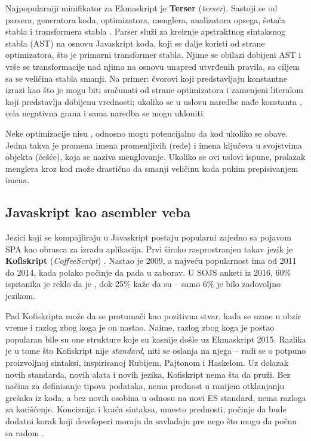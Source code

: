 Najpopularniji minifikator za Ekmaskript je \textbf{Terser} (\textsl{terser}).
Sastoji se od parsera, generatora koda, optimizatora, menglera, analizatora opsega, šetača stabla i transformera stabla \cite{uglify}.
Parser služi za kreirnje apstraktnog sintaksnog stabla (AST) na osnovu Javaskript koda, koji se dalje koristi od strane optimizatora, što je primarni transformer stabla.
Njime se obilazi dobijeni AST i vrše se transformacije nad njima na osnovu unapred utvrđenih pravila, sa ciljem sa se veličina stabla smanji.
Na primer: čvorovi koji predstavljaju konstantne izrazi kao što je  mogu biti sračunati od strane optimizatora i zamenjeni literalom koji predstavlja dobijenu vrednosti; ukoliko se u uslovu naredbe  nađe konstanta , cela negativna grana i sama naredba  se mogu ukloniti.

Neke optimizacije nisu , odnosno mogu potencijalno da  kod ukoliko se obave.
Jedna takva je promena imena promenljivih (ređe) i imena ključeva u svojstvima objekta (češće), koja se naziva menglovanje.
Ukoliko se ovi uslovi ispune, prolazak menglera kroz kod može drastično da smanji veličinu koda pukim prepisivanjem imena.

\subsection{Javaskript kao asembler veba}

Jezici koji se kompajliraju u Javaskript postaju popularni zajedno sa pojavom SPA kao obrasca za izradu aplikacija.
Prvi široko rasprostranjen takav jezik je \textbf{Kofiskript} (\textsl{CoffeeScript}) \cite{coffeescript-homepage}.
Nastao je 2009, a najveću popularnost ima od 2011 do 2014, kada polako počinje da pada u zaborav.
U SOJS anketi iz 2016, 60\% ispitanika je reklo da je , dok 25\% kaže da su  -- samo 6\% je bilo zadovoljno jezikom.

Pad Kofiskripta može da se protumači kao pozitivna stvar, kada se uzme u obzir vreme i razlog zbog koga je on nastao.
Naime, razlog zbog koga je postao popularan bile su one strukture koje su kasnije došle uz Ekmaskript 2015.
Razlika je u tome što Kofiskript nije \textit{standard}, niti se oslanja na njega -- radi se o potpuno proizvoljnoj sintaksi, inspirisanoj Rubijem, Pajtonom i Haskelom.
Uz dolazak novih standarda, novih alata i novih jezika, Kofiskript nema šta da pruži.
Bez načina za definisanje tipova podataka, nema prednost u ranijem otklanjanju grešaka iz koda, a bez novih osobina u odnosu na novi ES standard, nema razloga za korišćenje.
Konciznija i kraća sintaksa, umesto prednosti, počinje da bude dodatni korak koji developeri moraju da savladaju pre nego što mogu da počnu sa radom \cite{gh:coffeescript-future}.

